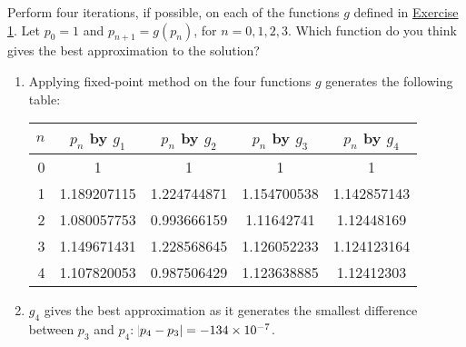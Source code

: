 \documentclass[../../../../Assignments]{subfiles}
\begin{document}
\begin{exercise}
    \begin{tasks}
        \task Perform four iterations, if possible, on each of the functions
            \(g\) defined in \hyperref[exer:2.2.1]{Exercise 1}. Let \(p_0 =
            1\) and \(p_{n + 1} = g(p_n)\), for \(n = 0, 1, 2, 3\).
        \task Which function do you think gives the best approximation to the
            solution?
    \end{tasks}
\end{exercise}

\begin{solution}
    \begin{enumerate}[label = \alph*)]
        \item Applying fixed-point method on the four functions \(g\) generates
            the following table:

            \begin{table}[H]
                \centering
                \begin{tabular}{r S[table-format=1.9] S[table-format=1.9] S[table-format=1.9] S[table-format=1.9]}
                    \toprule
                    \(n\)  & {\(p_n\) by \(g_1\)} & {\(p_n\) by \(g_2\)} & {\(p_n\) by \(g_3\)} & {\(p_n\) by \(g_4\)} \\
                      &  1                   &  1                   &  1                   &  1                   \\
                        1  &  1.189207115         &  1.224744871         &  1.154700538         &  1.142857143         \\
                        2  &  1.080057753         &  0.993666159         &  1.11642741          &  1.12448169          \\
                        3  &  1.149671431         &  1.228568645         &  1.126052233         &  1.124123164         \\
                        4  &  1.107820053         &  0.987506429         &  1.123638885         &  1.12412303          \\
                    \bottomrule
                \end{tabular}
            \end{table}

        \item \(g_4\) gives the best approximation as it generates the smallest
            difference between \(p_3\) and \(p_4\): \({\abs{p_4 - p_3} =
            \num{-134e-7}}\).
    \end{enumerate}
\end{solution}
\end{document}
